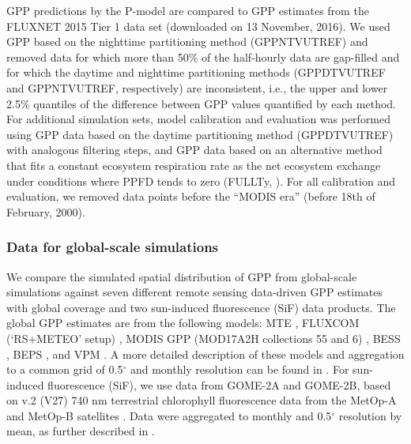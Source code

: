 \documentclass[gmd, manuscript]{copernicus}
\begin{document}
\label{sec:sites}

\label{sec:datafiltering}
GPP predictions by the P-model are compared to GPP estimates from the FLUXNET 2015 Tier 1 data set (downloaded on 13 November, 2016). We used GPP based on the nighttime partitioning method \citep{Reichstein2005-mp} (GPP\textunderscore NT\textunderscore VUT\textunderscore REF) and removed data for which more than 50\% of the half-hourly data are gap-filled and for which the daytime and nighttime partitioning methods (GPP\textunderscore DT\textunderscore VUT\textunderscore REF and GPP\textunderscore NT\textunderscore VUT\textunderscore REF, respectively) are inconsistent, i.e., the upper and lower 2.5\% quantiles of the difference between GPP values quantified by each method. For additional simulation sets, model calibration and evaluation was performed using GPP data based on the daytime partitioning method (GPP\textunderscore DT\textunderscore VUT\textunderscore REF) \citep{lasslop10} with analogous filtering steps, and GPP data based on an alternative method that fits a constant ecosystem respiration rate as the net ecosystem exchange under conditions where PPFD tends to zero (FULL\textunderscore Ty, \citet{wang17natpl}). For all calibration and evaluation, we removed data points before the ``MODIS era'' (before 18th of February, 2000).


\subsubsection{Data for global-scale simulations}
\label{sec:global_gpp_data}
We compare the simulated spatial distribution of GPP from global-scale simulations against seven different remote sensing data-driven GPP estimates with global coverage and two sun-induced fluorescence (SiF) data products. The global GPP estimates are from the following models: MTE \citep{jung11jgr}, FLUXCOM (`RS+METEO' setup) \citep{tramontana16bg}, MODIS GPP (MOD17A2H collections 55 and 6) \citep{running04, zhao05, modis_MOD17A2H}, BESS \citep{jiang16rse}, BEPS \citep{he18grl, chen16agrformet}, and VPM \citep{zhang17scidat}. A more detailed description of these models and aggregation to a common grid of 0.5$^{\circ}$ and monthly resolution can be found in \citet{luo18}. For sun-induced fluorescence (SiF), we use data from GOME-2A and GOME-2B, based on v.2 (V27) 740 nm terrestrial chlorophyll fluorescence data from the MetOp-A and MetOp-B satellites \citep{joiner13amt, joiner16amt}. Data were aggregated to monthly and 0.5$^{\circ}$ resolution by mean, as further described in \citet{luo18}.
\end{document}
